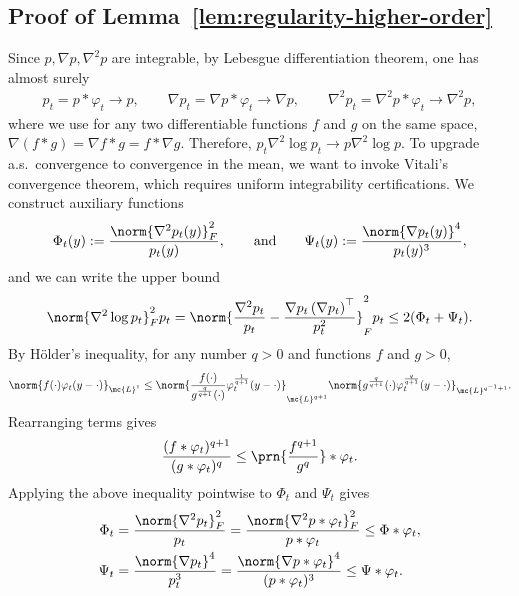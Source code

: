 \documentclass[11pt]{article}
\begin{document}
\subsection{Proof of Lemma~\ref{lem:regularity-higher-order}} \label{proof:regularity-higher-order}
Since $p, \nabla p, \nabla^2p$ are integrable, by Lebesgue differentiation theorem, one has almost surely
\begin{align*}
    p_t =p *\varphi_t \to p, \qquad \nabla p_t = \nabla p* \varphi_t \to \nabla p, \qquad \nabla^2p_t = \nabla^2 p * \varphi_t \to \nabla^2 p,
\end{align*}
where we use for any two differentiable functions $f$ and $g$ on the same space, $\nabla (f*g) = \nabla f* g= f*\nabla g$. Therefore, $p_t\nabla^2 \log p_t \to p\nabla^2 \log p$. To upgrade a.s.\ convergence to convergence in the mean, we want to invoke Vitali's convergence theorem, which requires uniform integrability certifications. We construct auxiliary functions
\begin{align*}
    \Phi_t(y) := \frac{\norm{\nabla^2 p_t(y)}_F^2}{p_t(y)}, \qquad \text{and} \qquad \Psi_t(y) := \frac{\norm{\nabla p_t(y)}^4}{p_t(y)^3},
\end{align*}
and we can write the upper bound
\begin{align}
    \norm{\nabla^2 \log p_t}_F^2 p_t = \norm{\frac{\nabla^2 p_t}{p_t}-\frac{\nabla p_t\left(\nabla p_t\right)^{\top}}{p_t^2}}_F^2 p_t \leq 2 (\Phi_t + \Psi_t). \label{eq:regularity-mid-1}
\end{align}
By H\"{o}lder's inequality, for any number $q > 0$ and functions $f$ and $g>0$,
\begin{align*}
    \norm{f(\cdot) \varphi_t(y-\cdot)}_{\mc{L}^1} \leq \norm{\frac{f(\cdot)}{g^{\frac{q}{q+1}}(\cdot)} \varphi_t^{\frac{1}{q+1}}(y-\cdot)}_{\mc{L}^{q+1}} \norm{g^{\frac{q}{q+1}}(\cdot) \varphi_t^{\frac{q}{q+1}}(y-\cdot)}_{\mc{L}^{q^{-1} + 1}}.
\end{align*}
Rearranging terms gives
\begin{align*}
    \frac{(f*\varphi_t)^{q+1}}{(g*\varphi_t)^q} \leq \prn{\frac{f^{q+1}}{g^q}}*\varphi_t.
\end{align*}
Applying the above inequality pointwise to $\Phi_t$ and $\Psi_t$ gives
\begin{align*}
    \Phi_t & = \frac{\norm{\nabla^2 p_t}_F^2}{p_t} = \frac{\norm{\nabla^2 p * \varphi_t}_F^2}{p * \varphi_t} \leq \Phi *\varphi_t, \\
    \Psi_t & = \frac{\norm{\nabla p_t}^4}{p_t^3} = \frac{\norm{\nabla p*\varphi_t}^4}{(p*\varphi_t)^3} \leq \Psi * \varphi_t.
\end{align*}
\end{document}

